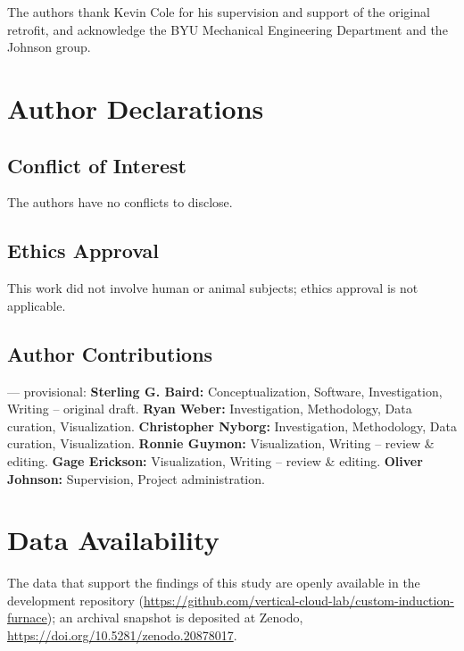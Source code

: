 \documentclass[%
 aip,
 rsi,%
 amsmath,amssymb,
 reprint,%
]{revtex4-2}
\newif\ifdraftnotes
\newcommand{\todo}[1]{\ifdraftnotes{\color{red}\textbf{[TODO: #1]}}\fi}
\begin{document}
\begin{acknowledgments}
The authors thank Kevin Cole for his supervision and support of the original
retrofit, and acknowledge the BYU Mechanical Engineering Department
and the Johnson group.
\todo{funding sources.}
\end{acknowledgments}

\section*{Author Declarations}

\subsection*{Conflict of Interest}

The authors have no conflicts to disclose. \todo{confirm with all authors.}

\subsection*{Ethics Approval}

This work did not involve human or animal subjects; ethics approval is not
applicable.

\subsection*{Author Contributions}

\todo{confirm CRediT roles} --- provisional: \textbf{Sterling G. Baird:}
Conceptualization, Software, Investigation, Writing -- original draft.
\textbf{Ryan Weber:} Investigation, Methodology, Data curation, Visualization.
\textbf{Christopher Nyborg:} Investigation, Methodology, Data curation,
Visualization.
\textbf{Ronnie Guymon:} Visualization, Writing -- review \& editing.
\textbf{Gage Erickson:} Visualization, Writing -- review \& editing.
\textbf{Oliver Johnson:} Supervision, Project administration.

\section*{Data Availability}

The data that support the findings of this study are openly available in the
development repository
(\url{https://github.com/vertical-cloud-lab/custom-induction-furnace}); an
archival snapshot is deposited at Zenodo,
\href{https://doi.org/10.5281/zenodo.20878017}{https://doi.org/10.5281/zenodo.20878017}.
\end{document}
